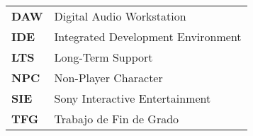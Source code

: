 
\renewcommand{\arraystretch}{1.5}



\begin{longtable}{l p{13.7cm}}
	
\textbf{DAW} & Digital Audio Workstation \\
\textbf{IDE} & Integrated Development Environment \\
\textbf{LTS} & Long-Term Support \\
\textbf{NPC} & Non-Player Character \\
\textbf{SIE} & Sony Interactive Entertainment \\
\textbf{TFG} & Trabajo de Fin de Grado \\

\end{longtable}
